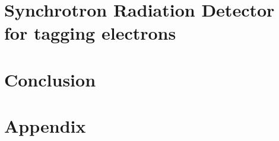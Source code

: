 
\chapter{Synchrotron Radiation Detector for tagging electrons}



\chapter{Conclusion}



\appendix
\chapter{Appendix}



\cleardoublepage





